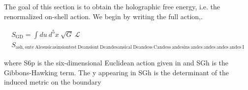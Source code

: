 \documentclass{article}
\begin{document}
The goal of this section is to obtain the holographic free energy, i.e. the renormalized on-shell
action. We begin by writing the full action,.


\begin{equation}
\begin{array} { r } { S _ { \mathrm { G D } } = \int d u ~ d ^ { 5 } x ~ \sqrt { G } ~ \mathcal { L } } \\ { S _ { \mathrm { a s h, o n t e ~ A l e s u s i c a s i n s i o n t e s t ~ D e a n s i o n t ~ D e a n d e s a n s i c a l ~ D e a n d e s s ~ C a n d e s s ~ a n d e s i n s ~ a n d e s ~ a n d e s ~ a n d e s ~ a n d e s ~ I}}}\end{array}
\end{equation}


where S6p is the six-dimensional Euclidean action given in and SGh is the Gibbons-Hawking
term. The y appearing in SGh is the determinant of the induced metric on the boundary
\end{document}
